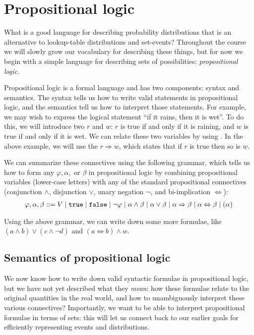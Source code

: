 \documentclass{tufte-handout}
\begin{document}
\section{Propositional logic}

What is a good language for describing probability distributions that is an 
alternative to lookup-table distributions and set-events? Throughout the course 
we will slowly grow our vocabulary for describing these things, but for now we 
begin with a simple language for describing sets of possibilities: \emph{propositional logic}.

Propositional logic is a formal language and has two components: syntax and
semantics. The syntax tells us how to write valid statements in propositional
logic, and the semantics tell us how to interpret those statements. For example, we 
may wish to express the logical statement ``if it rains, then it is wet''. To do 
this, we will introduce two  $r$ and $w$: $r$ is true 
if and only if it is raining, and $w$ is true if and only if it is wet. We can 
relate these two variables by using . In the above example, 
we will use the  $r \Rightarrow w$, which states that if $r$ is 
true then so is $w$. 

We can summarize these connectives using the following grammar, which tells us how to form 
any  $\varphi, \alpha,$ or $\beta$ in propositional
logic by combining propositional variables
(lower-case letters) with any of the standard propositional connectives (conjunction $\land$, disjunction $\lor$, 
unary negation $\neg$, and bi-implication $\Leftrightarrow$):
\begin{align}
    \varphi, \alpha, \beta ::= V \mid \texttt{true} \mid \texttt{false} \mid \neg \varphi \mid \alpha \land \beta \mid 
    \alpha \lor \beta \mid \alpha \Rightarrow \beta \mid \alpha \Leftrightarrow \beta 
    \mid (\alpha)
\end{align}

Using the above grammar, we can write down some more formulae, like
$(a \land b) \lor (c \land \neg d)$ and $(a \Leftrightarrow b) \land w$.

\subsection{Semantics of propositional logic}
We now know how to write down valid syntactic formulae in propositional logic, but 
we have not yet described what they \emph{mean}: how these formulae relate to the 
original quantities in the real world, and how to unambiguously interpret these various
connectives? Importantly, we want to be able to interpret propositional formulae 
in terms of sets: this will let us connect back to our earlier goals for 
efficiently representing events and distributions.
\end{document}
